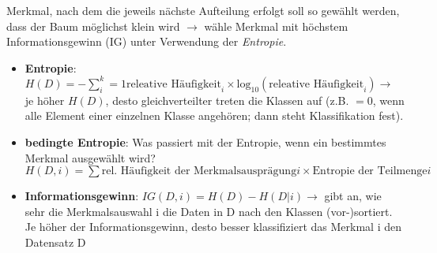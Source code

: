 Merkmal, nach dem die jeweils nächste Aufteilung erfolgt soll so gewählt werden, dass der Baum möglichst klein wird $\rightarrow$ wähle Merkmal mit höchstem Informationsgewinn (IG) unter Verwendung der \emph{Entropie}.
\begin{itemize}
    \item \textbf{Entropie}: $H(D)=-\sum^k_i=1\text{releative Häufigkeit}_i \times \text{log}_10 (\text{releative Häufigkeit}_i) \rightarrow$ je höher $H(D)$, desto gleichverteilter treten die Klassen auf (z.B. $=0$, wenn alle Element einer einzelnen Klasse angehören; dann steht Klassifikation fest).
    \item \textbf{bedingte Entropie}: Was passiert mit der Entropie, wenn ein bestimmtes Merkmal ausgewählt wird? $H(D,i)=\sum \text{rel. Häufigkeit der Merkmalsausprägung} i \times \text{Entropie der Teilmenge} i$
    \item \textbf{Informationsgewinn}: $IG(D, i) = H(D) - H(D\vert i) \rightarrow$ gibt an, wie sehr die Merkmalsauswahl i die Daten in D nach den Klassen (vor-)sortiert. Je höher der Informationsgewinn, desto besser klassifiziert das Merkmal i den Datensatz D
\end{itemize}